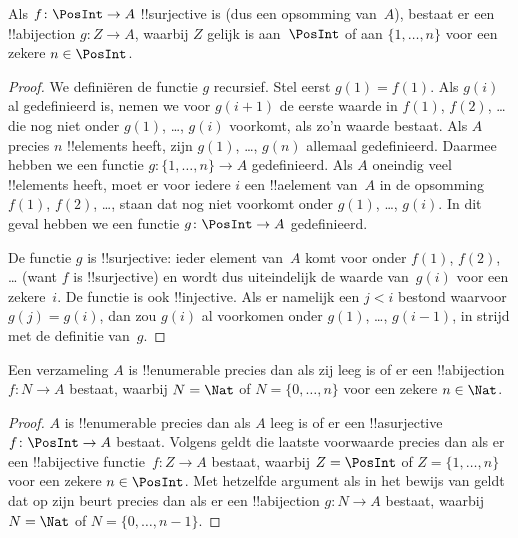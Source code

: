 \documentclass[openany]{memoir}
\begin{document}
\begin{prop}
Als $f\colon \PosInt \to A$ !!{surjective} is (dus een opsomming
van~$A$), bestaat er een !!a{bijection} $g\colon Z \to A$, waarbij $Z$
gelijk is aan~$\PosInt$ of aan $\{1, \dots, n\}$ voor een zekere
$n \in \PosInt$.
\end{prop}

\begin{proof}
  We definiëren de functie $g$ recursief. Stel eerst $g(1) = f(1)$.
  Als $g(i)$ al gedefinieerd is, nemen we voor $g(i+1)$ de eerste
  waarde in $f(1)$, $f(2)$, \dots{} die nog niet onder $g(1)$, \dots,
  $g(i)$ voorkomt, als zo'n waarde bestaat. Als $A$ precies $n$
  !!{element}s heeft, zijn $g(1)$, \dots, $g(n)$ allemaal gedefinieerd.
  Daarmee hebben we een functie $g\colon \{1, \dots, n\} \to A$
  gedefinieerd. Als $A$ oneindig veel !!{element}s heeft, moet er voor
  iedere $i$ een !!a{element} van~$A$ in de opsomming $f(1)$, $f(2)$,
  \dots, staan dat nog niet voorkomt onder $g(1)$, \dots, $g(i)$.
  In dit geval hebben we een functie $g\colon \PosInt \to A$
  gedefinieerd.
  
  De functie $g$ is !!{surjective}: ieder element van~$A$ komt voor
  onder $f(1)$, $f(2)$, \dots{} (want $f$ is !!{surjective}) en wordt
  dus uiteindelijk de waarde van~$g(i)$ voor een zekere~$i$. De functie
  is ook !!{injective}. Als er namelijk een $j < i$ bestond waarvoor
  $g(j) = g(i)$, dan zou $g(i)$ al voorkomen onder $g(1)$, \dots,
  $g(i-1)$, in strijd met de definitie van~$g$.
\end{proof}

\begin{cor}
Een verzameling $A$ is !!{enumerable} precies dan als zij leeg is of er
een !!a{bijection} $f\colon N \to A$ bestaat, waarbij $N = \Nat$ of
$N = \{0, \dots, n\}$ voor een zekere $n \in \Nat$.
\end{cor}

\begin{proof}
$A$ is !!{enumerable} precies dan als $A$ leeg is of er een
!!a{surjective} $f\colon \PosInt \to A$ bestaat. Volgens
 geldt die laatste voorwaarde precies dan als er
een !!a{bijective} functie~$f\colon Z \to A$ bestaat, waarbij $Z =
\PosInt$ of $Z = \{1, \dots, n\}$ voor een zekere $n \in \PosInt$.
Met hetzelfde argument als in het bewijs van 
geldt dat op zijn beurt precies dan als er een !!a{bijection}
$g\colon N \to A$ bestaat, waarbij $N = \Nat$ of
$N = \{0, \dots, n-1\}$.
\end{proof}
\end{document}
